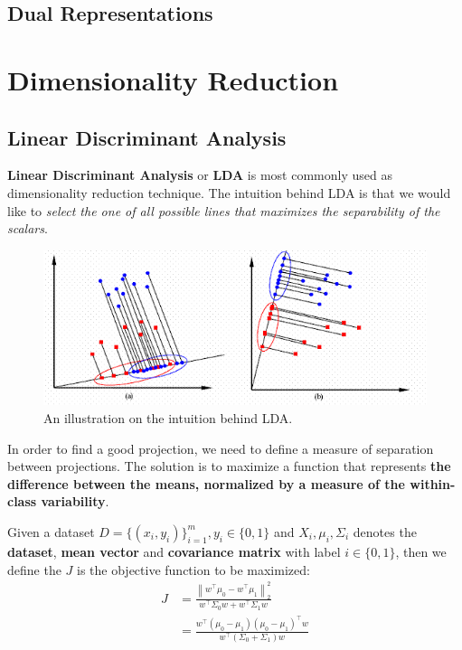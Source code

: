 \documentclass[a3paper, 12pt]{book} %
\begin{document}
\section{Dual Representations}



\chapter{Dimensionality Reduction}
\section{Linear Discriminant Analysis}
\textbf{Linear Discriminant Analysis} or \textbf{LDA} is most commonly used as dimensionality reduction technique. The intuition behind LDA is that we would like to \emph{select the one of all possible lines that maximizes the separability of the scalars}.

\begin{figure}[htpb]
	\centering
	\includegraphics[width=\linewidth]{figures/lda.png}
	\caption{An illustration on the intuition behind LDA.}
	\label{fig:boat1}
\end{figure}

In order to find a good projection, we need to define a measure of separation between projections. The solution is to maximize a function that represents \textbf{the difference between the means, normalized by a measure of the within-class variability}.

Given a dataset $D=\{(x_i,y_i)\}_{i=1}^m,y_i \in \{0,1\}$ and $X_i, \mu_i, \Sigma_i$ denotes the \textbf{dataset}, \textbf{mean vector} and \textbf{covariance matrix} with label $i \in \{0,1\}$, then we define the $J$ is the objective function to be maximized: 
\begin{equation}
	\begin{split}
	J&=\frac{\left\lVert w^\top \mu_0-w^\top \mu_1 \right\lVert_2^2}{w^\top \Sigma_0w + w^\top \Sigma_1w} \\
	 &=\frac{w^\top (\mu_0-\mu_1)(\mu_0-\mu_1)^\top w}{w^\top (\Sigma_0 + \Sigma_1) w}
	\end{split}
\end{equation}
\end{document}
